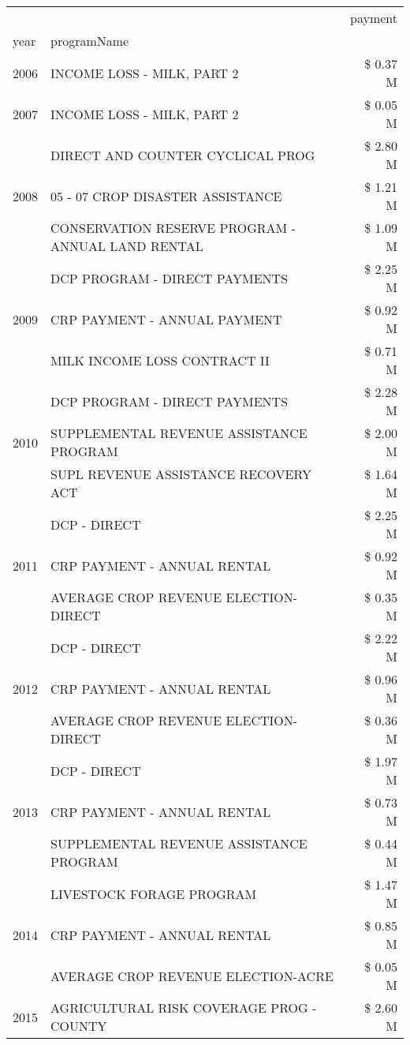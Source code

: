 \begin{tabular}{llr}
\toprule
 &  & payment \\
year & programName &  \\
\midrule
2006 & INCOME LOSS - MILK, PART 2 & \$ 0.37 M \\
\cline{1-3}
2007 & INCOME LOSS - MILK, PART 2 & \$ 0.05 M \\
\cline{1-3}
\multirow[t]{3}{*}{2008} & DIRECT AND COUNTER CYCLICAL PROG & \$ 2.80 M \\
 & 05 - 07 CROP DISASTER ASSISTANCE & \$ 1.21 M \\
 & CONSERVATION RESERVE PROGRAM - ANNUAL LAND RENTAL & \$ 1.09 M \\
\cline{1-3}
\multirow[t]{3}{*}{2009} & DCP PROGRAM - DIRECT PAYMENTS & \$ 2.25 M \\
 & CRP PAYMENT - ANNUAL PAYMENT & \$ 0.92 M \\
 & MILK INCOME LOSS CONTRACT II & \$ 0.71 M \\
\cline{1-3}
\multirow[t]{3}{*}{2010} & DCP PROGRAM - DIRECT PAYMENTS & \$ 2.28 M \\
 & SUPPLEMENTAL REVENUE ASSISTANCE PROGRAM & \$ 2.00 M \\
 & SUPL REVENUE ASSISTANCE RECOVERY ACT & \$ 1.64 M \\
\cline{1-3}
\multirow[t]{3}{*}{2011} & DCP - DIRECT & \$ 2.25 M \\
 & CRP PAYMENT - ANNUAL RENTAL & \$ 0.92 M \\
 & AVERAGE CROP REVENUE ELECTION-DIRECT & \$ 0.35 M \\
\cline{1-3}
\multirow[t]{3}{*}{2012} & DCP - DIRECT & \$ 2.22 M \\
 & CRP PAYMENT - ANNUAL RENTAL & \$ 0.96 M \\
 & AVERAGE CROP REVENUE ELECTION-DIRECT & \$ 0.36 M \\
\cline{1-3}
\multirow[t]{3}{*}{2013} & DCP - DIRECT & \$ 1.97 M \\
 & CRP PAYMENT - ANNUAL RENTAL & \$ 0.73 M \\
 & SUPPLEMENTAL REVENUE ASSISTANCE PROGRAM & \$ 0.44 M \\
\cline{1-3}
\multirow[t]{3}{*}{2014} & LIVESTOCK FORAGE PROGRAM & \$ 1.47 M \\
 & CRP PAYMENT - ANNUAL RENTAL & \$ 0.85 M \\
 & AVERAGE CROP REVENUE ELECTION-ACRE & \$ 0.05 M \\
\cline{1-3}
\multirow[t]{3}{*}{2015} & AGRICULTURAL RISK COVERAGE PROG - COUNTY & \$ 2.60 M \\

\end{tabular}
